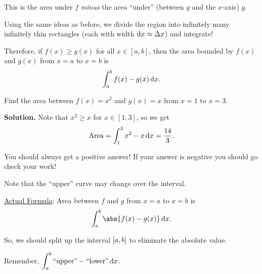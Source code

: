 This is the area under $ f $ \emph{minus} the area ``under'' (between $ g $ and the
$ x $-axis) $ g $.

Using the same ideas as before, we divide the region into infinitely many infinitely thin
rectangles (each with width $ \odif{x}\approx \Delta x $) and integrate!

Therefore, if $ f(x)\ge g(x) $ for all $ x\in[a,b] $, then the area bounded by
$ f(x) $ and $ g(x) $ from $ x=a $ to $ x=b $ is
\[ \int_{a}^{b} f(x)-g(x)\odif{x}. \]

\begin{Example}{}{}
    Find the area between $ f(x)=x^2 $ and $ g(x)=x $ from $ x=1 $ to $ x=3 $.

    \begin{center}
    \end{center}

    \textbf{Solution.} Note that $ x^2\ge x $ for $ x\in[1,3] $, so we get
    \[ \text{Area}
    =\int_{1}^{3}x^2-x\odif{x}=\frac{14}{3}. \]
\end{Example}

\begin{Remark}{}{}
    You should always get a positive answer! If your answer is negative you should go check
    your work!

    Note that the ``upper'' curve may change over the interval.
\end{Remark}

\underline{Actual Formula}: Area between $ f $ and $ g $ from $ x=a $ to $ x=b $ is
\[ \int_{a}^{b} \abs{f(x)-g(x)}\odif{x}.  \]

So, we should split up the interval $ \interval{a}{b} $ to eliminate
the absolute value.

Remember, $ \displaystyle \int_{a}^{b} \text{``upper''}-\text{``lower''}\odif{x} $.

